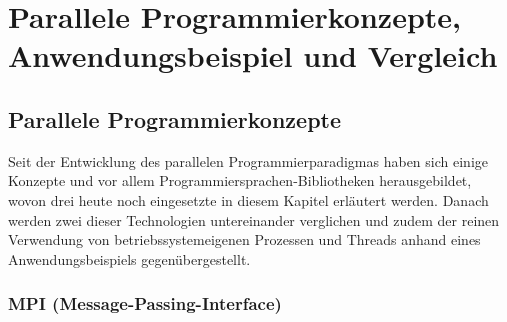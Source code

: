 
\chapter{Parallele Programmierkonzepte, Anwendungsbeispiel und Vergleich}

	\section{Parallele Programmierkonzepte}
		\label{ParalleleProgrammierkonzepte}
	
		Seit der Entwicklung des parallelen Programmierparadigmas haben sich einige Konzepte und vor allem Programmiersprachen-Bibliotheken herausgebildet, wovon drei heute noch eingesetzte in diesem Kapitel erläutert werden. Danach werden zwei dieser Technologien untereinander verglichen und zudem der reinen Verwendung von betriebssystemeigenen Prozessen und Threads anhand eines Anwendungsbeispiels gegenübergestellt.
		
		\subsection{MPI (Message-Passing-Interface)}
			\label{MPI}

